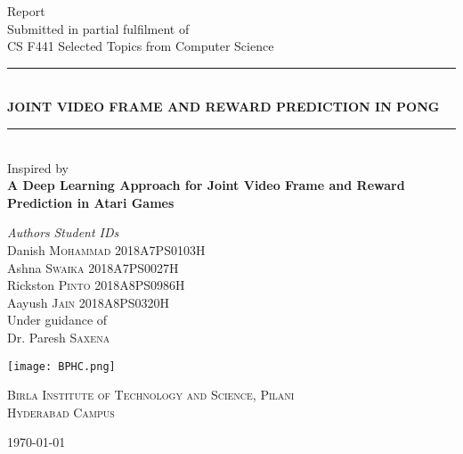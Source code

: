 \documentclass[12pt, a4paper, oneside]{report}
\begin{document}
    \begin{titlepage}
        \newcommand{\HRule}{\rule{\linewidth}{0.5mm}}
        \centering
        
            {\large Report}\\
            {Submitted in partial fulfilment of }\\
            {CS F441 Selected Topics from Computer Science}\\
            \HRule\\
            \vspace{0.6cm}
            {\Large \bfseries JOINT VIDEO FRAME AND REWARD PREDICTION IN PONG}
            \HRule\\

            \vfill
            {Inspired by}\\
            {\large \bfseries A Deep Learning Approach for Joint Video Frame and Reward Prediction in Atari Games}\\
            \vfill

            \textit{Authors} \hfill
            \textit{Student IDs}\\
            Danish \textsc{Mohammad} \hfill 2018A7PS0103H\\
            Ashna \textsc{Swaika} \hfill 2018A7PS0027H\\
            Rickston \textsc{Pinto} \hfill 2018A8PS0986H\\
            Aayush \textsc{Jain} \hfill 2018A8PS0320H\\
            
            \vspace{0.5cm}
            {Under guidance of}\\
            {\large Dr. Paresh \textsc{Saxena}}\\
            \vspace{1cm}

            \texttt{[image: BPHC.png]}\\
            \begin{spacing}{1}
                \textsc{Birla Institute of Technology and Science, Pilani}\\
                \textsc{Hyderabad Campus}\\
            \end{spacing}
            \vspace{0.5cm}
            {\large\today}
            \pagecolor{lightYellow}
    \end{titlepage}
    \pagecolor{white}
    \tableofcontents
    \listoffigures
\end{document}
